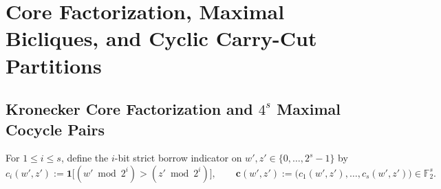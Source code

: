 \documentclass[11pt,reqno]{amsart}
\theoremstyle{definition}
\theoremstyle{remark}
\newcommand{\FF}{\mathbb{F}}
\newcommand{\ind}{\mathbf{1}}
\newcommand{\bv}{\mathbf{c}}
\numberwithin{equation}{section}
\begin{document}
\section{Core Factorization, Maximal Bicliques, and Cyclic Carry-Cut Partitions}
\label{sec:core-partitions}

\subsection{Kronecker Core Factorization and \texorpdfstring{$4^s$}{4\^s} Maximal Cocycle Pairs}
For $1 \le i \le s$, define the $i$-bit strict borrow indicator on $w', z' \in \{0, \dots, 2^s - 1\}$ by
\begin{equation}
  \label{eq:borrow-def}
  c_i(w', z') := \ind\bigl[(w' \bmod 2^i) > (z' \bmod 2^i)\bigr], \qquad \bv(w', z') := \bigl(c_1(w', z'), \dots, c_s(w', z')\bigr) \in \FF_2^s.
\end{equation}
\end{document}
